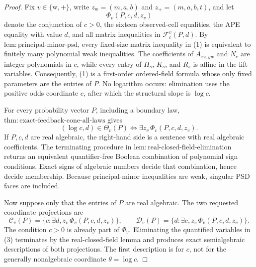 \documentclass{article}
\begin{document}
\begin{proof}
Fix \(v\in\{\mathrm w,+\}\), write \(z_{\mathrm w}=(m,a,b)\) and \(z_+=(m,a,b,t)\), and let
\[
 \Phi_v(P,c,d,z_v) \tag{1}
\]
denote the conjunction of \(c>0\), the sixteen observed-cell equalities, the APE equality with value \(d\), and all matrix inequalities in \(\mathcal F_c^v(P,d)\).  By \(\mathrm{lem{:}principal\text{-}minor\text{-}psd}\), every fixed-size matrix inequality in (1) is equivalent to finitely many polynomial weak inequalities.  The coefficients of \(A_{xz,yw}\) and \(N_c\) are integer polynomials in \(c\), while every entry of \(H_s\), \(K_s\), and \(R_s\) is affine in the lift variables.  Consequently, (1) is a first-order ordered-field formula whose only fixed parameters are the entries of \(P\).  No logarithm occurs: elimination uses the positive odds coordinate \(c\), after which the structural slope is \(\log c\).

For every probability vector \(P\), including a boundary law, \(\mathrm{thm{:}exact\text{-}feedback\text{-}cone\text{-}all\text{-}laws}\) gives
\[
 (\log c,d)\in\Theta_v(P)
 \Longleftrightarrow
 \exists z_v\,\Phi_v(P,c,d,z_v). \tag{2}
\]
If \(P,c,d\) are real algebraic, the right-hand side is a sentence with real algebraic coefficients.  The terminating procedure in \(\mathrm{lem{:}real\text{-}closed\text{-}field\text{-}elimination}\) returns an equivalent quantifier-free Boolean combination of polynomial sign conditions.  Exact signs of algebraic numbers decide that combination, hence decide membership.  Because principal-minor inequalities are weak, singular PSD faces are included.

Now suppose only that the entries of \(P\) are real algebraic.  The two requested coordinate projections are
\[
 \mathcal C_v(P)=\{c:\exists d,z_v\,\Phi_v(P,c,d,z_v)\},
 \qquad
 \mathcal D_v(P)=\{d:\exists c,z_v\,\Phi_v(P,c,d,z_v)\}. \tag{3}
\]
The condition \(c>0\) is already part of \(\Phi_v\).  Eliminating the quantified variables in (3) terminates by the real-closed-field lemma and produces exact semialgebraic descriptions of both projections.  The first description is for \(c\), not for the generally nonalgebraic coordinate \(\theta=\log c\).


\end{proof}
\end{document}
